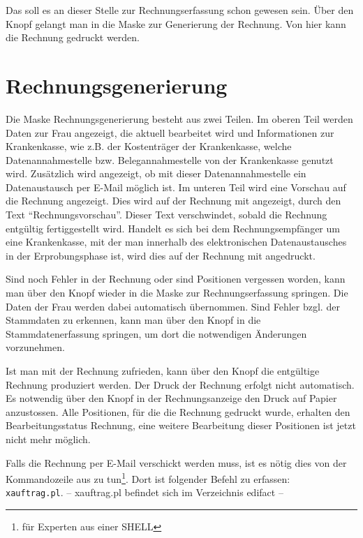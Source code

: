 Das soll es an dieser Stelle zur Rechnungserfassung schon gewesen sein.
Über den Knopf  gelangt man in die Maske 
zur Generierung
der Rechnung. Von hier kann die Rechnung gedruckt werden.
%
\section{Rechnungsgenerierung}\label{kurz:rechnungsgenerierung:kap}
Die Maske Rechnungsgenerierung besteht aus zwei Teilen. Im oberen
Teil werden Daten zur Frau angezeigt, die aktuell bearbeitet wird und
Informationen zur Krankenkasse, wie z.B. der Kostenträger der Krankenkasse,
welche Datenannahmestelle bzw. Belegannahmestelle von der Krankenkasse
genutzt wird. Zusätzlich wird angezeigt, ob mit dieser Datenannahmestelle
ein Datenaustausch per E-Mail möglich ist.
Im unteren Teil wird eine Vorschau auf die Rechnung angezeigt. Dies wird
auf der Rechnung mit angezeigt, durch den Text ``Rechnungsvorschau''. Dieser
Text verschwindet, sobald die Rechnung entgültig fertiggestellt wird.
Handelt es
sich bei dem Rechnungsempfänger um eine Krankenkasse, mit der man innerhalb des
elektronischen Datenaustausches in der Erprobungsphase ist, wird dies auf
der Rechnung mit angedruckt. 

Sind noch Fehler in der Rechnung oder sind Positionen vergessen worden,
kann man über den Knopf  wieder in die Maske
zur Rechnungserfassung springen. Die Daten der Frau werden dabei automatisch
übernommen. Sind Fehler bzgl. der Stammdaten zu erkennen, kann man über den
Knopf  in die Stammdatenerfassung springen, um dort
die notwendigen Änderungen vorzunehmen.

Ist man
mit der Rechnung zufrieden, kann über den Knopf 
die entgültige Rechnung produziert werden. Der Druck der Rechnung erfolgt nicht
automatisch. Es notwendig über den Knopf  in der
Rechnungsanzeige den Druck auf Papier anzustossen. Alle Positionen, für die
die Rechnung gedruckt wurde, erhalten den Bearbeitungsstatus Rechnung,
eine weitere Bearbeitung dieser Positionen ist jetzt nicht mehr
möglich.\marginline{\Huge\bfseries!}%

Falls die Rechnung per E-Mail verschickt werden muss, ist es nötig
dies von der Kommandozeile aus zu tun\footnote{für Experten aus einer SHELL}.
Dort ist folgender Befehl zu erfassen:\\
\verb|xauftrag.pl|. -- xauftrag.pl befindet
sich im Verzeichnis edifact --

